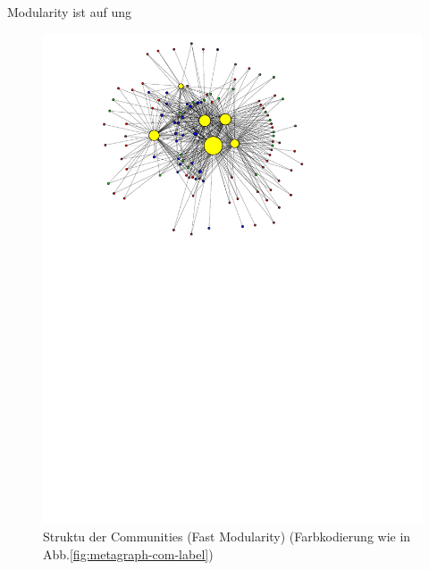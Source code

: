 Modularity ist auf ung
\begin{figure}[h]
  \centering
  \includegraphics[scale=1.0]{images/fastmod-metagraph-20.pdf}
  \caption{Struktu der Communities (Fast Modularity) (Farbkodierung
    wie in Abb.\ref{fig:metagraph-com-label})}
  \label{fig:metagraph-com-fastmod}
\end{figure}

